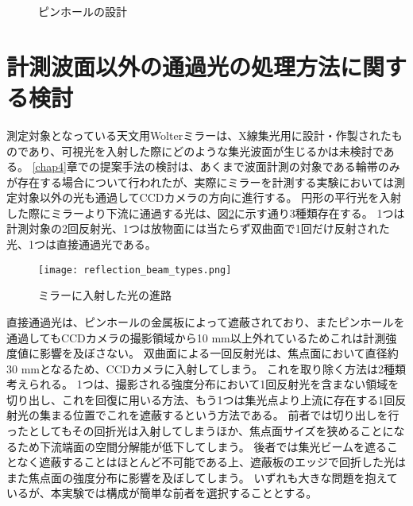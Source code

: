 \begin{figure}[!ht]
\centering

\caption[]{ピンホールの設計}
\label{fig:pinhole_arrangement_pictures}
\end{figure}


\clearpage
\newpage

\section{計測波面以外の通過光の処理方法に関する検討}
測定対象となっている天文用Wolterミラーは、X線集光用に設計・作製されたものであり、可視光を入射した際にどのような集光波面が生じるかは未検討である。
\ref{chap4}章での提案手法の検討は、あくまで波面計測の対象である輪帯のみが存在する場合について行われたが、実際にミラーを計測する実験においては測定対象以外の光も通過してCCDカメラの方向に進行する。
円形の平行光を入射した際にミラーより下流に通過する光は、図\ref{fig:mirror_beam_path_types}に示す通り3種類存在する。
1つは計測対象の2回反射光、1つは放物面には当たらず双曲面で1回だけ反射された光、1つは直接通過光である。

\begin{figure}[!ht]
\centering
\texttt{[image: reflection\_beam\_types.png]}
\caption{ミラーに入射した光の進路}
\label{fig:mirror_beam_path_types}
\end{figure}

直接通過光は、ピンホールの金属板によって遮蔽されており、またピンホールを通過してもCCDカメラの撮影領域から10 mm以上外れているためこれは計測強度値に影響を及ぼさない。
双曲面による一回反射光は、焦点面において直径約30 mmとなるため、CCDカメラに入射してしまう。
これを取り除く方法は2種類考えられる。
1つは、撮影される強度分布において1回反射光を含まない領域を切り出し、これを回復に用いる方法、もう1つは集光点より上流に存在する1回反射光の集まる位置でこれを遮蔽するという方法である。
前者では切り出しを行ったとしてもその回折光は入射してしまうほか、焦点面サイズを狭めることになるため下流端面の空間分解能が低下してしまう。
後者では集光ビームを遮ることなく遮蔽することはほとんど不可能である上、遮蔽板のエッジで回折した光はまた焦点面の強度分布に影響を及ぼしてしまう。
いずれも大きな問題を抱えているが、本実験では構成が簡単な前者を選択することとする。


